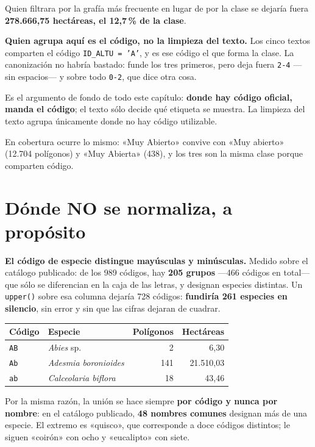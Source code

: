\documentclass[11pt,a4paper]{report}
\newcommand{\campo}[1]{\textcolor{conaf}{\textbf{#1}}}
\newcommand{\orig}[1]{\texttt{\small #1}}
\begin{document}
Quien filtrara por la grafía más frecuente en lugar de por la clase se dejaría
fuera \campo{278.666,75 hectáreas, el 12,7\,\% de la clase}.

\begin{alerta}
\campo{Quien agrupa aquí es el código, no la limpieza del texto.} Los cinco
textos comparten el código \orig{ID\_ALTU = 'A'}, y es ese código el que forma
la clase. La canonización no habría bastado: funde los tres primeros, pero deja
fuera \orig{2-4} —sin espacios— y sobre todo \orig{0-2}, que dice otra cosa.

Es el argumento de fondo de todo este capítulo: \campo{donde hay código
oficial, manda el código}; el texto sólo decide qué etiqueta se muestra. La
limpieza del texto agrupa únicamente donde no hay código utilizable.
\end{alerta}

En cobertura ocurre lo mismo: «Muy Abierto» convive con «Muy abierto» (12.704
polígonos) y «Muy Abierta» (438), y los tres son la misma clase porque comparten
código.

\section{Dónde NO se normaliza, a propósito}

\begin{alerta}
\campo{El código de especie distingue mayúsculas y minúsculas.} Medido sobre el
catálogo publicado: de los 989 códigos, hay \textbf{205 grupos} —466 códigos en
total— que sólo se diferencian en la caja de las letras, y designan especies
distintas. Un \orig{upper()} sobre esa columna dejaría 728 códigos:
\campo{fundiría 261 especies en silencio}, sin error y sin que las cifras
dejaran de cuadrar.

\begin{center}
\begin{tabular}{@{}llrr@{}}
\toprule
\textbf{Código} & \textbf{Especie} & \textbf{Polígonos} & \textbf{Hectáreas}\\
\midrule
\orig{AB} & \emph{Abies} sp. & 2 & 6,30\\
\orig{Ab} & \emph{Adesmia boronioides} & 141 & 21.510,03\\
\orig{ab} & \emph{Calceolaria biflora} & 18 & 43,46\\
\bottomrule
\end{tabular}
\end{center}
\end{alerta}

Por la misma razón, la unión se hace siempre \campo{por código y nunca por
nombre}: en el catálogo publicado, \textbf{48 nombres comunes} designan más de
una especie. El extremo es «quisco», que corresponde a doce códigos distintos;
le siguen «coirón» con ocho y «eucalipto» con siete.
\end{document}
